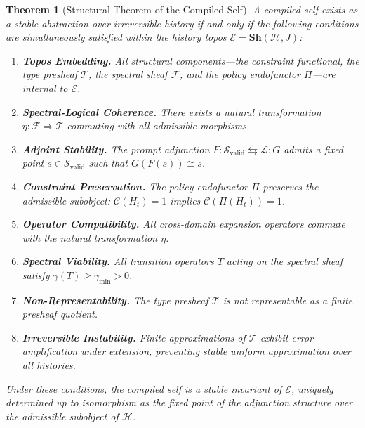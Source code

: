 \documentclass[12pt, a4paper]{article}
\theoremstyle{plain}
\newtheorem{theorem}{Theorem}[section]
\theoremstyle{definition}
\theoremstyle{remark}
\begin{document}
\begin{theorem}[Structural Theorem of the Compiled Self]
\label{thm:structural}
A compiled self exists as a stable abstraction over irreversible history if and only if the following conditions are simultaneously satisfied within the history topos $\mathcal{E} = \mathbf{Sh}(\mathcal{H}, J)$:

\begin{enumerate}

\item \textbf{Topos Embedding.} All structural components---the constraint functional, the type presheaf $\mathcal{T}$, the spectral sheaf $\mathcal{F}$, and the policy endofunctor $\Pi$---are internal to $\mathcal{E}$.

\item \textbf{Spectral-Logical Coherence.} There exists a natural transformation $\eta : \mathcal{F} \Rightarrow \mathcal{T}$ commuting with all admissible morphisms.

\item \textbf{Adjoint Stability.} The prompt adjunction $F : \mathcal{S}_{\mathrm{valid}} \leftrightarrows \mathcal{L} : G$ admits a fixed point $s \in \mathcal{S}_{\mathrm{valid}}$ such that $G(F(s)) \cong s$.

\item \textbf{Constraint Preservation.} The policy endofunctor $\Pi$ preserves the admissible subobject: $\mathcal{C}(H_t) = 1$ implies $\mathcal{C}(\Pi(H_t)) = 1$.

\item \textbf{Operator Compatibility.} All cross-domain expansion operators commute with the natural transformation $\eta$.

\item \textbf{Spectral Viability.} All transition operators $T$ acting on the spectral sheaf satisfy $\gamma(T) \geq \gamma_{\min} > 0$.

\item \textbf{Non-Representability.} The type presheaf $\mathcal{T}$ is not representable as a finite presheaf quotient.

\item \textbf{Irreversible Instability.} Finite approximations of $\mathcal{T}$ exhibit error amplification under extension, preventing stable uniform approximation over all histories.

\end{enumerate}

Under these conditions, the compiled self is a stable invariant of $\mathcal{E}$, uniquely determined up to isomorphism as the fixed point of the adjunction structure over the admissible subobject of $\mathcal{H}$.
\end{theorem}
\end{document}
